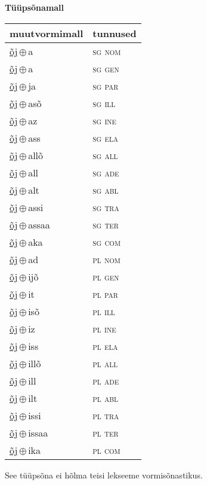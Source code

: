 

\vspace{3.5em}
\noindent \begin{minipage}{\textwidth}
\noindent \textbf{Tüüpsõnamall \,}\\

\begin{sideways}
\begin{tabular}{l l}
muutvormimall & tunnused \\
\hline
\underline{õj}\,$\oplus$\,a & \textsc{ sg nom } \\
\underline{õj}\,$\oplus$\,a & \textsc{ sg gen } \\
\underline{õj}\,$\oplus$\,ja & \textsc{ sg par } \\
\underline{õj}\,$\oplus$\,asõ & \textsc{ sg ill } \\
\underline{õj}\,$\oplus$\,az & \textsc{ sg ine } \\
\underline{õj}\,$\oplus$\,ass & \textsc{ sg ela } \\
\underline{õj}\,$\oplus$\,allõ & \textsc{ sg all } \\
\underline{õj}\,$\oplus$\,all & \textsc{ sg ade } \\
\underline{õj}\,$\oplus$\,alt & \textsc{ sg abl } \\
\underline{õj}\,$\oplus$\,assi & \textsc{ sg tra } \\
\underline{õj}\,$\oplus$\,assaa & \textsc{ sg ter } \\
\underline{õj}\,$\oplus$\,aka & \textsc{ sg com } \\
\underline{õj}\,$\oplus$\,ad & \textsc{ pl nom } \\
\underline{õj}\,$\oplus$\,ijõ & \textsc{ pl gen } \\
\underline{õj}\,$\oplus$\,it & \textsc{ pl par } \\
\underline{õj}\,$\oplus$\,isõ & \textsc{ pl ill } \\
\underline{õj}\,$\oplus$\,iz & \textsc{ pl ine } \\
\underline{õj}\,$\oplus$\,iss & \textsc{ pl ela } \\
\underline{õj}\,$\oplus$\,illõ & \textsc{ pl all } \\
\underline{õj}\,$\oplus$\,ill & \textsc{ pl ade } \\
\underline{õj}\,$\oplus$\,ilt & \textsc{ pl abl } \\
\underline{õj}\,$\oplus$\,issi & \textsc{ pl tra } \\
\underline{õj}\,$\oplus$\,issaa & \textsc{ pl ter } \\
\underline{õj}\,$\oplus$\,ika & \textsc{ pl com } \\
\end{tabular}
\end{sideways}
\label{tab:tüüpsõnamall-õja}

\end{minipage}

 
\vspace{1em}
\noindent See tüüpsõna ei hõlma teisi lekseeme vormi\-sõnastikus.
